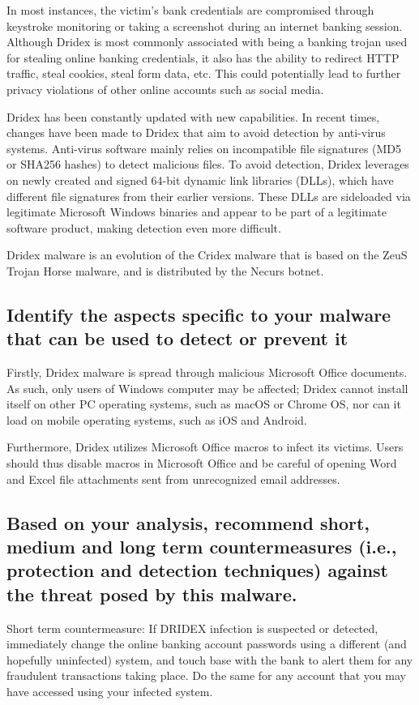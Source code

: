 \documentclass[conference]{IEEEtran}
\begin{document}
In most instances, the victim's bank credentials are compromised through keystroke monitoring or taking a screenshot during an internet banking session. Although Dridex is most commonly associated with being a banking trojan used for stealing online banking credentials, it also has the ability to redirect HTTP traffic, steal cookies, steal form data, etc. This could potentially lead to further privacy violations of other online accounts such as social media.

Dridex has been constantly updated with new capabilities. In recent times, changes have been made to Dridex that aim to avoid detection by anti-virus systems. Anti-virus software mainly relies on incompatible file signatures (MD5 or SHA256 hashes) to detect malicious files. To avoid detection, Dridex leverages on newly created and signed 64-bit dynamic link libraries (DLLs), which have different file signatures from their earlier versions. These DLLs are sideloaded via legitimate Microsoft Windows binaries and appear to be part of a legitimate software product, making detection even more difficult.

Dridex malware is an evolution of the Cridex malware that is based on the ZeuS Trojan Horse malware, and is distributed by the Necurs botnet.

\subsection{Identify the aspects specific to your malware that can be used to detect or prevent it}
Firstly, Dridex malware is spread through malicious Microsoft Office documents. As such, only users of Windows computer may be affected; Dridex cannot install itself on other PC operating systems, such as macOS or Chrome OS, nor can it load on mobile operating systems, such as iOS and Android.

Furthermore, Dridex utilizes Microsoft Office macros to infect its victims. Users should thus disable macros in Microsoft Office and be careful of opening Word and Excel file attachments sent from unrecognized email addresses.

\subsection{Based on your analysis, recommend short, medium and long term countermeasures (i.e., protection and detection techniques) against the threat posed by this malware.}
Short term countermeasure:
If DRIDEX infection is suspected or detected, immediately change the online banking account passwords using a different (and hopefully uninfected) system, and touch base with the bank to alert them for any fraudulent transactions taking place. Do the same for any account that you may have accessed using your infected system.
\end{document}
